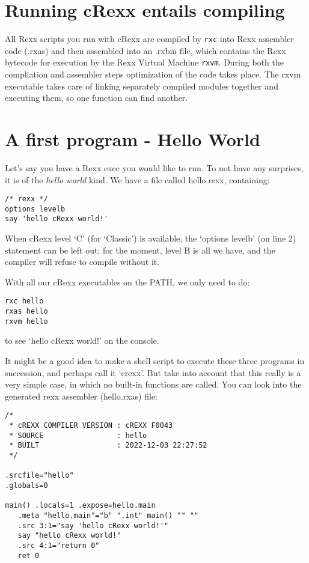 \hypertarget{running-crexx-entails-compiling}{%
\section{Running cRexx entails
compiling}\label{running-crexx-entails-compiling}}

All Rexx scripts you run with cRexx are compiled by \texttt{rxc} into
Rexx assembler code (.rxas) and then assembled into an .rxbin file,
which contains the Rexx bytecode for execution by the Rexx Virtual
Machine \texttt{rxvm}. During both the compliation and assembler steps
optimization of the code takes place. The rxvm executable takes care of
linking separately compiled modules together and executing them, so one
function can find another.

\hypertarget{a-first-program---hello-world}{%
\section{A first program - Hello
World}\label{a-first-program---hello-world}}

Let's say you have a Rexx exec you would like to run. To not have any
surprises, it is of the \emph{hello world} kind. We have a file called
hello.rexx, containing:

\begin{verbatim}
/* rexx */
options levelb
say 'hello cRexx world!'
\end{verbatim}

When cRexx level `C' (for `Classic') is available, the `options levelb'
(on line 2) statement can be left out; for the moment, level B is all we
have, and the compiler will refuse to compile without it.

With all our cRexx executables on the PATH, we only need to do:

\begin{verbatim}
rxc hello
rxas hello
rxvm hello
\end{verbatim}

to see `hello cRexx world!' on the console.

It might be a good idea to make a shell script to execute these three
programs in succession, and perhaps call it `crexx'. But take into
account that this really is a very simple case, in which no built-in
functions are called. You can look into the generated rexx assembler
(hello.rxas) file:

\begin{verbatim}
/*
 * cREXX COMPILER VERSION : cREXX F0043
 * SOURCE                 : hello
 * BUILT                  : 2022-12-03 22:27:52
 */

.srcfile="hello"
.globals=0

main() .locals=1 .expose=hello.main
   .meta "hello.main"="b" ".int" main() "" ""
   .src 3:1="say 'hello cRexx world!'"
   say "hello cRexx world!"
   .src 4:1="return 0"
   ret 0
\end{verbatim}

